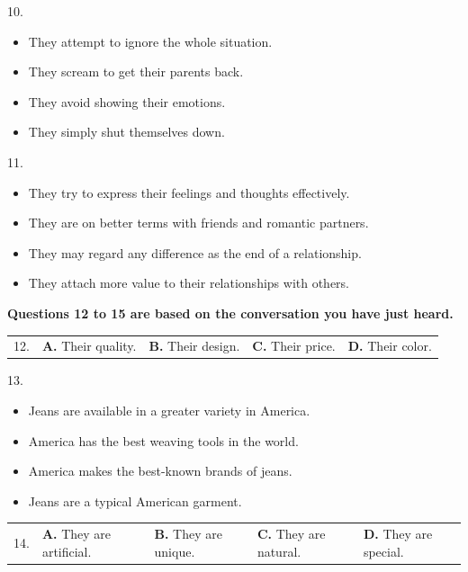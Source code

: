 \documentclass[UTF8,11pt]{ctexart}
\begin{document}
10.


\begin{itemize}[leftmargin=2em,itemsep=.2em,topsep=.4em]\item[A.] They attempt to ignore the whole situation.
\item[B.] They scream to get their parents back.
\item[C.] They avoid showing their emotions.
\item[D.] They simply shut themselves down.
\end{itemize}

11.


\begin{itemize}[leftmargin=2em,itemsep=.2em,topsep=.4em]\item[A.] They try to express their feelings and thoughts effectively.
\item[B.] They are on better terms with friends and romantic partners.
\item[C.] They may regard any difference as the end of a relationship.
\item[D.] They attach more value to their relationships with others.
\end{itemize}

\textbf{Questions 12 to 15 are based on the conversation you have just heard.}


\noindent\begin{tabularx}{\linewidth}{@{}lXXXX@{}}12. & \textbf{A.} Their quality. & \textbf{B.} Their design. & \textbf{C.} Their price. & \textbf{D.} Their color.\\\end{tabularx}\par

13.


\begin{itemize}[leftmargin=2em,itemsep=.2em,topsep=.4em]\item[A.] Jeans are available in a greater variety in America.
\item[B.] America has the best weaving tools in the world.
\item[C.] America makes the best-known brands of jeans.
\item[D.] Jeans are a typical American garment.
\end{itemize}

\noindent\begin{tabularx}{\linewidth}{@{}lXXXX@{}}14. & \textbf{A.} They are artificial. & \textbf{B.} They are unique. & \textbf{C.} They are natural. & \textbf{D.} They are special.\\\end{tabularx}\par
\end{document}
